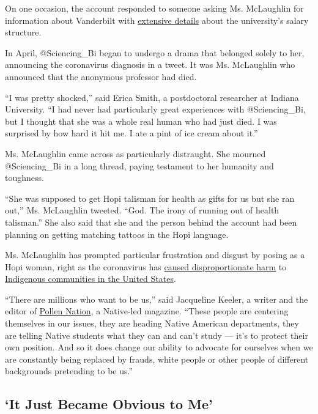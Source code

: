 On one occasion, the account responded to someone asking Ms. McLaughlin
for information about Vanderbilt with
\href{https://twitter.com/IsabelOtt/status/1290101201397329921/photo/1}{extensive
details} about the university's salary structure.

In April, @Sciencing\_Bi began to undergo a drama that belonged solely
to her, announcing the coronavirus diagnosis in a tweet. It was Ms.
McLaughlin who announced that the anonymous professor had died.

``I was pretty shocked,'' said Erica Smith, a postdoctoral researcher at
Indiana University. ``I had never had particularly great experiences
with @Sciencing\_Bi, but I thought that she was a whole real human who
had just died. I was surprised by how hard it hit me. I ate a pint of
ice cream about it.''

Ms. McLaughlin came across as particularly distraught. She mourned
@Sciencing\_Bi in a long thread, paying testament to her humanity and
toughness.

``She was supposed to get Hopi talisman for health as gifts for us but
she ran out,'' Ms. McLaughlin tweeted. ``God. The irony of running out
of health talisman.'' She also said that she and the person behind the
account had been planning on getting matching tattoos in the Hopi
language.

Ms. McLaughlin has prompted particular frustration and disgust by posing
as a Hopi woman, right as the coronavirus has
\href{https://www.nytimes3xbfgragh.onion/2020/04/09/us/coronavirus-navajo-nation.html}{caused
disproportionate harm} to
\href{https://www.nytimes3xbfgragh.onion/2020/07/30/us/native-americans-coronavirus-data.html}{Indigenous
communities in the United States}.

``There are millions who want to be us,'' said Jacqueline Keeler, a
writer and the editor of
\href{https://www.pollennationmagazine.com/}{Pollen Nation}, a
Native-led magazine. ``These people are centering themselves in our
issues, they are heading Native American departments, they are telling
Native students what they can and can't study --- it's to protect their
own position. And so it does change our ability to advocate for
ourselves when we are constantly being replaced by frauds, white people
or other people of different backgrounds pretending to be us.''

\hypertarget{it-just-became-obvious-to-me}{%
\subsection{`It Just Became Obvious to
Me'}\label{it-just-became-obvious-to-me}}

